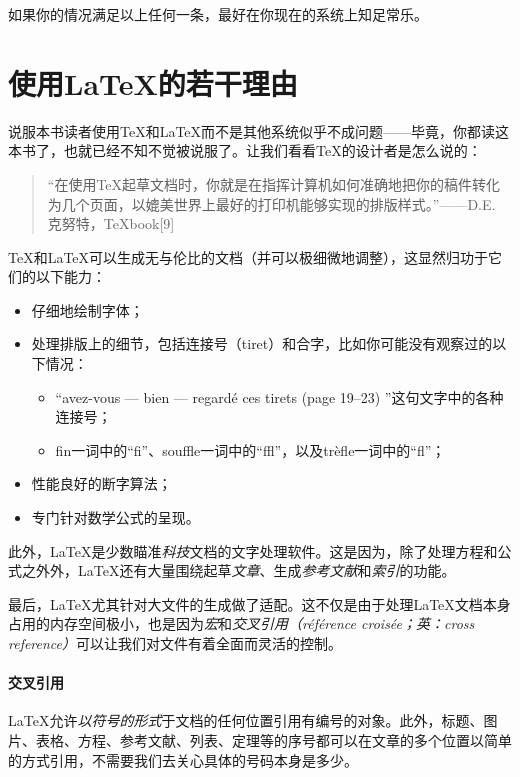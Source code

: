 如果你的情况满足以上任何一条，最好在你现在的系统上知足常乐。

\section*{使用\LaTeX 的若干理由}

说服本书读者使用\TeX 和\LaTeX 而不是其他系统似乎不成问题——毕竟，你都读这本书了，也就已经不知不觉被说服了。让我们看看\TeX 的设计者是怎么说的：

\begin{quote}
    “在使用\TeX 起草文档时，你就是在指挥计算机如何准确地把你的稿件转化为几个页面，以媲美世界上最好的打印机能够实现的排版样式。”——D.E. 克努特，\TeX book[9]
\end{quote}

\TeX 和\LaTeX 可以生成无与伦比的文档（并可以极细微地调整），这显然归功于它们的以下能力：

\begin{itemize}
    \item 仔细地绘制字体；
    \item 处理排版上的细节，包括连接号（tiret）和合字，比如你可能没有观察过的以下情况：
    \begin{itemize}
        \item “avez-vous --- bien --- regardé ces tirets (page 19--23) ”这句文字中的各种连接号；
        \item fin一词中的“f\/i”、souffle一词中的“f\/f\/l”，以及trèfle一词中的“f\/l”；
    \end{itemize}
    \item 性能良好的断字算法；
    \item 专门针对数学公式的呈现。
\end{itemize}

此外，\LaTeX 是少数瞄准\textit{科技}文档的文字处理软件。这是因为，除了处理方程和公式之外外，\LaTeX 还有大量围绕起草\textit{文章}、生成\textit{参考文献}和\textit{索引}的功能。

最后，\LaTeX 尤其针对大文件的生成做了适配。这不仅是由于处理\LaTeX 文档本身占用的内存空间极小，也是因为\textit{宏}和\textit{交叉引用（référence croisée；英：cross reference）}可以让我们对文件有着全面而灵活的控制。

\paragraph*{交叉引用}\LaTeX 允许\textit{以符号的形式}于文档的任何位置引用有编号的对象。此外，标题、图片、表格、方程、参考文献、列表、定理等的序号都可以在文章的多个位置以简单的方式引用，不需要我们去关心具体的号码本身是多少。

